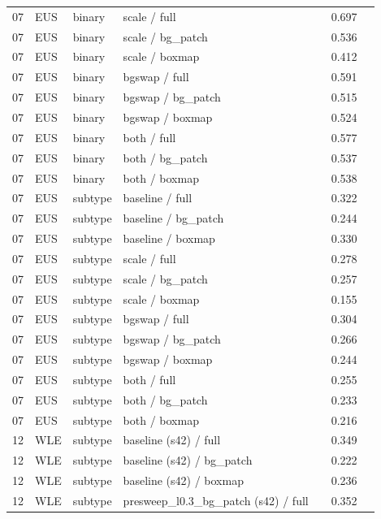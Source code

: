 \begin{longtable}{cL{1.1cm}L{1.5cm}L{5.6cm}ccc}
07 & EUS & binary & scale / full & \nl{} & 0.697 & \nl{} \\
07 & EUS & binary & scale / bg\_patch & \nl{} & 0.536 & \nl{} \\
07 & EUS & binary & scale / boxmap & \nl{} & 0.412 & \nl{} \\
07 & EUS & binary & bgswap / full & \nl{} & 0.591 & \nl{} \\
07 & EUS & binary & bgswap / bg\_patch & \nl{} & 0.515 & \nl{} \\
07 & EUS & binary & bgswap / boxmap & \nl{} & 0.524 & \nl{} \\
07 & EUS & binary & both / full & \nl{} & 0.577 & \nl{} \\
07 & EUS & binary & both / bg\_patch & \nl{} & 0.537 & \nl{} \\
07 & EUS & binary & both / boxmap & \nl{} & 0.538 & \nl{} \\
07 & EUS & subtype & baseline / full & \nl{} & 0.322 & \nl{} \\
07 & EUS & subtype & baseline / bg\_patch & \nl{} & 0.244 & \nl{} \\
07 & EUS & subtype & baseline / boxmap & \nl{} & 0.330 & \nl{} \\
07 & EUS & subtype & scale / full & \nl{} & 0.278 & \nl{} \\
07 & EUS & subtype & scale / bg\_patch & \nl{} & 0.257 & \nl{} \\
07 & EUS & subtype & scale / boxmap & \nl{} & 0.155 & \nl{} \\
07 & EUS & subtype & bgswap / full & \nl{} & 0.304 & \nl{} \\
07 & EUS & subtype & bgswap / bg\_patch & \nl{} & 0.266 & \nl{} \\
07 & EUS & subtype & bgswap / boxmap & \nl{} & 0.244 & \nl{} \\
07 & EUS & subtype & both / full & \nl{} & 0.255 & \nl{} \\
07 & EUS & subtype & both / bg\_patch & \nl{} & 0.233 & \nl{} \\
07 & EUS & subtype & both / boxmap & \nl{} & 0.216 & \nl{} \\
12 & WLE & subtype & baseline (s42) / full & \nl{} & 0.349 & \nl{} \\
12 & WLE & subtype & baseline (s42) / bg\_patch & \nl{} & 0.222 & \nl{} \\
12 & WLE & subtype & baseline (s42) / boxmap & \nl{} & 0.236 & \nl{} \\
12 & WLE & subtype & presweep\_l0.3\_bg\_patch (s42) / full & \nl{} & 0.352 & \nl{} \\

\end{longtable}
